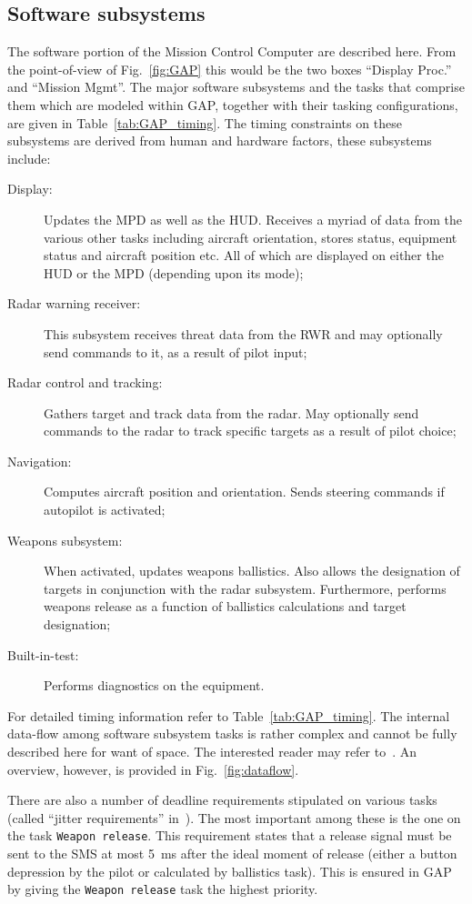 \subsection{Software subsystems}
The software portion of the Mission Control Computer are described
here. From the point-of-view of Fig.~\ref{fig:GAP} this would be the
two boxes ``Display Proc.'' and ``Mission Mgmt''. The major software
subsystems and the tasks that comprise them which are modeled within
GAP, together with their tasking configurations, are given in
Table~\ref{tab:GAP_timing}. The timing constraints on these subsystems
are derived from human and hardware factors, these subsystems include:

\begin{description}
\item[Display:]{Updates the MPD as well as the HUD. Receives a myriad
  of data from the various other tasks including aircraft orientation,
  stores status, equipment status and aircraft position etc. All of
  which are displayed on either the HUD or the MPD (depending upon its
  mode);}
\item[Radar warning receiver:]{This subsystem receives threat data
  from the RWR and may optionally send commands to it, as a result of
  pilot input;}
\item[Radar control and tracking:]{Gathers target and track data from
  the radar. May optionally send commands to the radar to track
  specific targets as a result of pilot choice;}
\item[Navigation:]{Computes aircraft position and orientation. Sends
  steering commands if autopilot is activated;}
\item[Weapons subsystem:]{When activated, updates weapons
  ballistics. Also allows the designation of targets in conjunction
  with the radar subsystem. Furthermore, performs weapons release as a
  function of ballistics calculations and target designation;}
\item[Built-in-test:]{Performs diagnostics on the equipment.}
\end{description}

For detailed timing information refer to
Table~\ref{tab:GAP_timing}. The internal data-flow among software
subsystem tasks is rather complex and cannot be fully described here
for want of space. The interested reader may refer
to~\cite{locke@sei90}. An overview, however, is provided in
Fig.~\ref{fig:dataflow}.

There are also a number of deadline requirements stipulated on various
tasks (called ``jitter requirements'' in~\cite{locke@rtss91}). The
most important among these is the one on the task \texttt{Weapon
release}. This requirement states that a release signal must be sent
to the SMS at most 5~ms after the ideal moment of release (either a
button depression by the pilot or calculated by ballistics task). This
is ensured in GAP by giving the \texttt{Weapon release} task the
highest priority.


